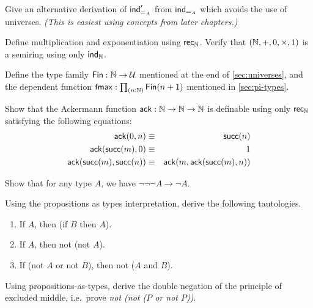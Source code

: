 \begin{ex}\label{ex:pm-to-ml}
Give an alternative derivation of $\mathsf{ind}_{=_{A}}'$ from $\mathsf{ind}_{=_{A}}$ which avoids the use of universes.
  \emph{(This is easiest using concepts from later chapters.)}
\end{ex}

\begin{ex}
  Define multiplication and exponentiation using $\mathsf{rec}_{\mathbb{N}}$.
  Verify that $(\mathbb{N},+,0,\times,1)$ is a semiring using only $\mathsf{ind}_{\mathbb{N}}$.  
\end{ex}

\begin{ex}\label{ex:fin}
  Define the type family $\mathsf{Fin} : \mathbb{N} \to \mathcal{U}$ mentioned at the end of \autoref{sec:universes}, and the dependent function $\fmax : \prd{n:\nat} \Fin(n+1)$ mentioned in \autoref{sec:pi-types}.
\end{ex}

\begin{ex}\label{ex:ackermann}
  Show that the Ackermann function $\mathsf{ack} : \mathbb{N} \to \mathbb{N} \to \mathbb{N}$ is definable using only $\mathsf{rec}_{\mathbb{N}}$ satisfying the following equations:
  \begin{eqnarray*}
    \mathsf{ack}(0,n) & \equiv & \mathsf{succ}(n) \\
    \mathsf{ack}(\mathsf{succ}(m),0) & \equiv & 1 \\
    \mathsf{ack}(\mathsf{succ}(m),\mathsf{succ}(n)) & \equiv & \mathsf{ack}(m,\mathsf{ack}(\mathsf{succ}(m),n))
  \end{eqnarray*}
\end{ex}

\begin{ex}\label{ex:neg-ldn}
  Show that for any type $A$, we have $\neg\neg\neg A \to \neg A$.
\end{ex}

\begin{ex}\label{ex:tautologies}
  Using the propositions as types interpretation, derive the following tautologies.
  \begin{enumerate}
  \item If $A$, then (if $B$ then $A$).
  \item If $A$, then not (not $A$).
  \item If (not $A$ or not $B$), then not ($A$ and $B$).
  \end{enumerate}
\end{ex}

\begin{ex}\label{ex:not-not-lem}
  Using propositions-as-types, derive the double negation of the principle of excluded middle, i.e.\ prove \emph{not (not ($P$ or not $P$))}.
\end{ex}

